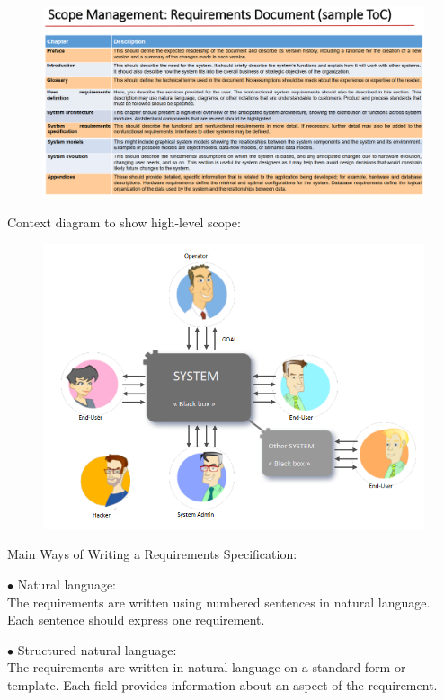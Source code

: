 \documentclass[]{project_plan}
\newcommand{\bulletPoint}{\hspace{-3.1pt}$\bullet$ \hspace{5pt}}
\begin{document}
\newpage

\begin{figure}[h!]
  \centering
  \includegraphics[width=\linewidth]{requirements_document.png}
\end{figure}

Context diagram to show high-level scope:

\begin{figure}[h!]
  \centering
  \includegraphics[width=35em]{scope_context_diagram.png}
\end{figure}

\newpage

Main Ways of Writing a Requirements Specification:

\bulletPoint Natural language:\\
The requirements are written using numbered sentences in natural language. Each sentence
should express one requirement.

\bulletPoint Structured natural language:\\
The requirements are written in natural language on a standard form or template. Each field
provides information about an aspect of the requirement.
\end{document}
